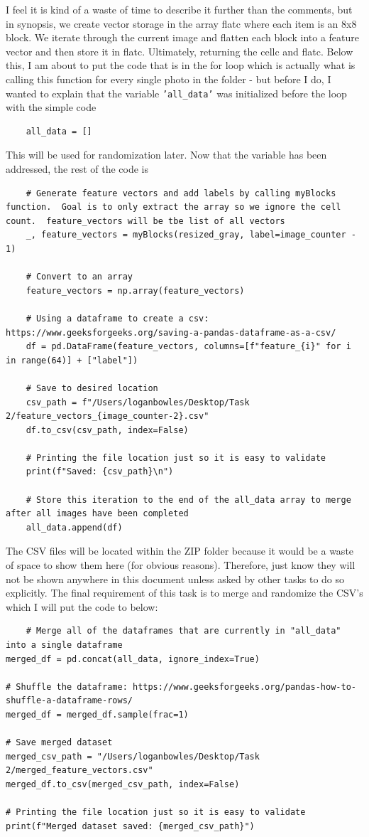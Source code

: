 \documentclass[conference]{IEEEtran} %
\begin{document}
I feel it is kind of a waste of time to describe it further than the comments, but in synopsis, we create vector storage in the array flatc where each item is an 8x8 block.  We iterate through the current image and flatten each block into a feature vector and then store it in flatc.  Ultimately, returning the cellc and flatc.  Below this, I am about to put the code that is in the for loop which is actually what is calling this function for every single photo in the folder - but before I do, I wanted to explain that the variable \texttt{'all\_data'} was initialized before the loop with the simple code 
\begin{lstlisting}
    all_data = []
\end{lstlisting}
This will be used for randomization later. Now that the variable has been addressed, the rest of the code is 
\begin{lstlisting}
    # Generate feature vectors and add labels by calling myBlocks function.  Goal is to only extract the array so we ignore the cell count.  feature_vectors will be tbe list of all vectors
    _, feature_vectors = myBlocks(resized_gray, label=image_counter - 1)  
    
    # Convert to an array
    feature_vectors = np.array(feature_vectors)  
    
    # Using a dataframe to create a csv: https://www.geeksforgeeks.org/saving-a-pandas-dataframe-as-a-csv/
    df = pd.DataFrame(feature_vectors, columns=[f"feature_{i}" for i in range(64)] + ["label"])

    # Save to desired location
    csv_path = f"/Users/loganbowles/Desktop/Task 2/feature_vectors_{image_counter-2}.csv"
    df.to_csv(csv_path, index=False)
    
    # Printing the file location just so it is easy to validate
    print(f"Saved: {csv_path}\n")
    
    # Store this iteration to the end of the all_data array to merge after all images have been completed
    all_data.append(df)
\end{lstlisting}
The CSV files will be located within the ZIP folder because it would be a waste of space to show them here (for obvious reasons). Therefore, just know they will not be shown anywhere in this document unless asked by other tasks to do so explicitly.  The final requirement of this task is to merge and randomize the CSV's which I will put the code to below:

\begin{lstlisting}
    # Merge all of the dataframes that are currently in "all_data" into a single dataframe
merged_df = pd.concat(all_data, ignore_index=True)

# Shuffle the dataframe: https://www.geeksforgeeks.org/pandas-how-to-shuffle-a-dataframe-rows/
merged_df = merged_df.sample(frac=1)

# Save merged dataset
merged_csv_path = "/Users/loganbowles/Desktop/Task 2/merged_feature_vectors.csv"
merged_df.to_csv(merged_csv_path, index=False)

# Printing the file location just so it is easy to validate
print(f"Merged dataset saved: {merged_csv_path}")
\end{lstlisting}
\end{document}
